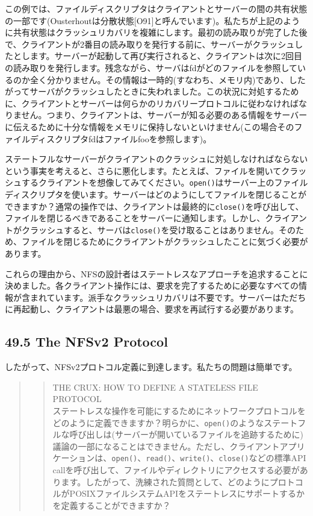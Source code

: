 この例では、ファイルディスクリプタはクライアントとサーバーの間の共有状態の一部です(Ousterhoutは分散状態{[}O91{]}と呼んでいます)。私たちが上記のように共有状態はクラッシュリカバリを複雑にします。最初の読み取りが完了した後で、クライアントが2番目の読み取りを発行する前に、サーバーがクラッシュしたとします。サーバーが起動して再び実行されると、クライアントは次に2回目の読み取りを発行します。残念ながら、サーバはfdがどのファイルを参照しているのか全く分かりません。その情報は一時的(すなわち、メモリ内)であり、したがってサーバがクラッシュしたときに失われました。この状況に対処するために、クライアントとサーバーは何らかのリカバリープロトコルに従わなければなりません。つまり、クライアントは、サーバーが知る必要のある情報をサーバーに伝えるために十分な情報をメモリに保持しないといけません(この場合そのファイルディスクリプタfdはファイルfooを参照します)。

ステートフルなサーバーがクライアントのクラッシュに対処しなければならないという事実を考えると、さらに悪化します。たとえば、ファイルを開いてクラッシュするクライアントを想像してみてください。\texttt{open()}はサーバー上のファイルディスクリプタを使います。サーバーはどのようにしてファイルを閉じることができますか？通常の操作では、クライアントは最終的に\texttt{close()}を呼び出して、ファイルを閉じるべきであることをサーバーに通知します。しかし、クライアントがクラッシュすると、サーバは\texttt{close()}を受け取ることはありません。そのため、ファイルを閉じるためにクライアントがクラッシュしたことに気づく必要があります。

これらの理由から、NFSの設計者はステートレスなアプローチを追求することに決めました。各クライアント操作には、要求を完了するために必要なすべての情報が含まれています。派手なクラッシュリカバリは不要です。サーバーはただちに再起動し、クライアントは最悪の場合、要求を再試行する必要があります。

\hypertarget{the-nfsv2-protocol}{%
\subsection*{49.5 The NFSv2 Protocol}\label{the-nfsv2-protocol}}

したがって、NFSv2プロトコル定義に到達します。私たちの問題は簡単です。

\begin{quote}
\begin{quote}
THE CRUX: HOW TO DEFINE A STATELESS FILE PROTOCOL\\
ステートレスな操作を可能にするためにネットワークプロトコルをどのように定義できますか？明らかに、\texttt{open()}のようなステートフルな呼び出しは(サーバーが開いているファイルを追跡するために)議論の一部になることはできません。ただし、クライアントアプリケーションは、\texttt{open()}、\texttt{read()}、\texttt{write()}、\texttt{close()}などの標準API
callを呼び出して、ファイルやディレクトリにアクセスする必要があります。したがって、洗練された質問として、どのようにプロトコルがPOSIXファイルシステムAPIをステートレスにサポートするかを定義することができますか？
\end{quote}
\end{quote}

